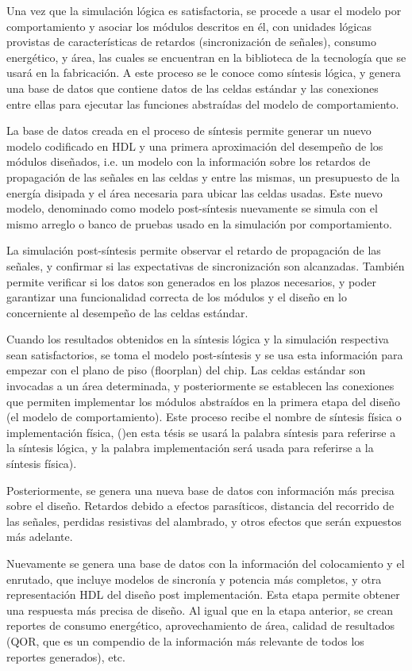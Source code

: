 Una vez que la simulación lógica es satisfactoria, se procede a usar el modelo por comportamiento y asociar los módulos descritos en él, con unidades lógicas provistas de características de retardos (sincronización de señales), consumo energético, y área, las cuales se encuentran en la biblioteca de la tecnología que se usará en la fabricación. A este proceso se le conoce como síntesis lógica, y genera una base de datos que contiene datos de las celdas estándar y las conexiones entre ellas para ejecutar las funciones abstraídas del modelo de comportamiento.

La base de datos creada en el proceso de síntesis permite generar un nuevo modelo codificado en HDL y una primera aproximación del desempeño de los módulos diseñados, i.e. un modelo con la información sobre los retardos de propagación de las señales en las celdas y entre las mismas, un presupuesto de la energía disipada y el área necesaria para ubicar las celdas usadas. Este nuevo modelo, denominado como modelo post-síntesis nuevamente se simula con el mismo arreglo o banco de pruebas usado en la simulación por comportamiento.

La simulación post-síntesis permite observar el retardo de propagación de las señales, y confirmar si las expectativas de sincronización son alcanzadas. También permite verificar si los datos son generados en los plazos necesarios, y poder garantizar una funcionalidad correcta de los módulos y el diseño en lo concerniente al desempeño de las celdas estándar. 

Cuando los resultados obtenidos en la síntesis lógica y la simulación respectiva sean satisfactorios, se toma el modelo post-síntesis y se usa esta información para empezar con el plano de piso (floorplan) del chip. Las celdas estándar son invocadas a un área determinada, y posteriormente se establecen las conexiones que permiten implementar los módulos abstraídos en la primera etapa del diseño (el modelo de comportamiento). Este proceso recibe el nombre de síntesis física o implementación física, ()en esta tésis se usará la palabra síntesis para referirse a la síntesis lógica, y la palabra implementación será usada para referirse a la síntesis física).

Posteriormente, se genera una nueva base de datos con información más precisa sobre el diseño. Retardos debido a efectos parasíticos, distancia del recorrido de las señales, perdidas resistivas del alambrado, y otros efectos que serán expuestos más adelante.

Nuevamente se genera una base de datos con la información del colocamiento y el enrutado, que incluye modelos de sincronía y potencia más completos, y otra representación HDL del diseño post implementación. Esta etapa permite obtener una respuesta más precisa de diseño. Al igual que en la etapa anterior, se crean reportes de consumo energético, aprovechamiento de área, calidad de resultados (QOR, que es un compendio de la información más relevante de todos los reportes generados), etc.

